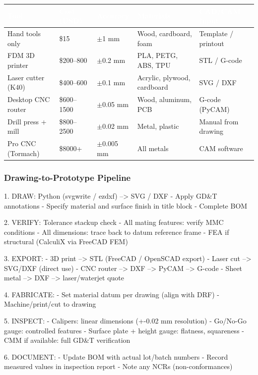 \documentclass[11pt,letterpaper]{article}
\newcommand{\tableheader}[1]{\textbf{\sffamily\textcolor{white}{#1}}}
\begin{document}
\begin{center}
\begin{tabularx}{\textwidth}{L{2.5cm}C{1.5cm}C{1.5cm}L{2.5cm}X}
\toprule
{}
\tableheader{Tool} & \tableheader{Cost (USD)} & \tableheader{Accuracy} & \tableheader{Materials} & \tableheader{CAD/CAM Input} \\
\midrule
Hand tools only & \$15 & $\pm$1 mm & Wood, cardboard, foam & Template / printout \\
FDM 3D printer & \$200--800 & $\pm$0.2 mm & PLA, PETG, ABS, TPU & STL / G-code \\
Laser cutter (K40) & \$400--600 & $\pm$0.1 mm & Acrylic, plywood, cardboard & SVG / DXF \\
Desktop CNC router & \$600--1500 & $\pm$0.05 mm & Wood, aluminum, PCB & G-code (PyCAM) \\
Drill press + mill & \$800--2500 & $\pm$0.02 mm & Metal, plastic & Manual from drawing \\
Pro CNC (Tormach) & \$8000+ & $\pm$0.005 mm & All metals & CAM software \\
\bottomrule
\end{tabularx}
\end{center}

\subsubsection{Drawing-to-Prototype Pipeline}

\begin{asciibox}
1. DRAW: Python (svgwrite / ezdxf) --> SVG / DXF
   - Apply GD\&T annotations
   - Specify material and surface finish in title block
   - Complete BOM

2. VERIFY: Tolerance stackup check
   - All mating features: verify MMC conditions
   - All dimensions: trace back to datum reference frame
   - FEA if structural (CalculiX via FreeCAD FEM)

3. EXPORT:
   - 3D print --> STL (FreeCAD / OpenSCAD export)
   - Laser cut --> SVG/DXF (direct use)
   - CNC router --> DXF --> PyCAM --> G-code
   - Sheet metal --> DXF --> laser/waterjet quote

4. FABRICATE:
   - Set material datum per drawing (align with DRF)
   - Machine/print/cut to drawing

5. INSPECT:
   - Calipers: linear dimensions (+-0.02 mm resolution)
   - Go/No-Go gauge: controlled features
   - Surface plate + height gauge: flatness, squareness
   - CMM if available: full GD\&T verification

6. DOCUMENT:
   - Update BOM with actual lot/batch numbers
   - Record measured values in inspection report
   - Note any NCRs (non-conformances)
\end{asciibox}
\end{document}

